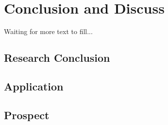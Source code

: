 \section{Conclusion and Discuss}

Waiting for more text to fill...
\subsection{Research Conclusion}
\subsection{Application}
\subsection{Prospect}

